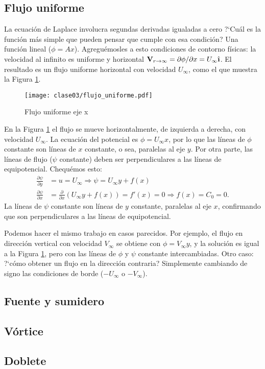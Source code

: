 \subsection*{Flujo uniforme}
La ecuación de Laplace involucra segundas derivadas igualadas a cero
\mbox{?`}Cuál es la función más simple que pueden pensar que cumple con esa condición? Una función lineal ($\phi=Ax$).
Agreguémosles a esto condiciones de contorno físicas: la velocidad al infinito es uniforme y horizontal $\mathbf{V}_{r\to\infty}=\partial\phi/\partial x=U_\infty\ihat$.
El resultado es un flujo uniforme horizontal con velocidad $U_\infty$, como el que muestra la Figura \ref{fig:flujo_uniforme}.
%
\begin{figure}[!h]
\centering
\texttt{[image: clase03/flujo\_uniforme.pdf]}
\caption{Flujo uniforme eje x}
\label{fig:flujo_uniforme}
\end{figure}

En la Figura \ref{fig:flujo_uniforme} el flujo se mueve horizontalmente, de izquierda a derecha, con velocidad $U_\infty$.
La ecuación del potencial es $\phi=U_\infty x$, por lo que las líneas de $\phi$ constante son líneas de $x$ constante, o sea, paralelas al eje $y$.
Por otra parte, las líneas de flujo ($\psi$ constante) deben ser perpendiculares a las líneas de equipotencial.
Chequémos esto:
%
\begin{align}
\frac{\partial\psi}{\partial y} &= u = U_\infty \Rightarrow \psi=U_\infty y + f(x) \nonumber \\
\frac{\partial\psi}{\partial x} &= \frac{\partial}{\partial x}\left(U_\infty y + f(x)\right) = f'(x) = 0 \Rightarrow f(x) = C_0 = 0.
\end{align}
%
La líneas de $\psi$ constante son líneas de $y$ constante, paralelas al eje $x$, confirmando que son perpendiculares a las líneas de equipotencial.

Podemos hacer el mismo trabajo en casos parecidos.
Por ejemplo, el flujo en dirección vertical con velocidad $V_\infty$ se obtiene con $\phi=V_\infty y$, y la solución es igual a la Figura \ref{fig:flujo_uniforme}, pero con las líneas de $\phi$ y $\psi$ constante intercambiadas.
Otro caso: \mbox{?`}cómo obtener un flujo en la dirección contraria? Simplemente cambiando de signo las condiciones de borde ($-U_\infty$ o $-V_\infty$).

\subsection*{Fuente y sumidero}

\subsection*{Vórtice}

\subsection*{Doblete}
